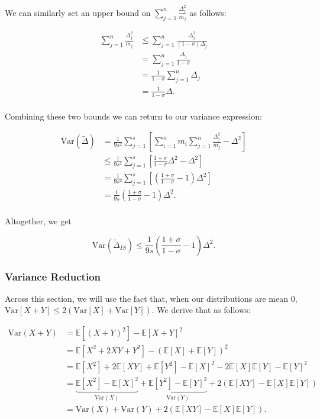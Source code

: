 \documentclass[11pt, margin=1in]{article}
\begin{document}
We can similarly set an upper bound on $\sum_{j = 1}^{n}\frac{\Delta_j^2}{m_j}$ as follows:

\[
\begin{aligned}
\sum_{j = 1}^{n}\frac{\Delta_j^2}{m_j} &\leq \sum_{j = 1}^{n}\frac{\Delta_j^2}{\left(1 - \sigma\right) \Delta_j} \\
&= \sum_{j = 1}^{n}\frac{\Delta_j}{1 - \sigma} \\
&= \frac{1}{1 - \sigma} \sum_{j = 1}^{n}\Delta_j \\
&= \frac{1}{1 - \sigma} \Delta. \\
\end{aligned}
\]

Combining these two bounds we can return to our variance expression:

\[
\begin{aligned}
\mathrm{Var}\left(\tilde{\Delta}\right) &= \frac{1}{9s^2} \sum_{j = 1}^{s} \left[\sum_{i = 1}^{n}m_i \sum_{j = 1}^{n}\frac{\Delta_j^2}{m_j} - \Delta^2\right] \\
&\leq \frac{1}{9s^2} \sum_{j = 1}^{s} \left[\frac{1 + \sigma}{1 - \sigma} \Delta^2 - \Delta^2\right] \\
&= \frac{1}{9s^2} \sum_{j = 1}^{s} \left[\left(\frac{1 + \sigma}{1 - \sigma} - 1\right) \Delta^2\right] \\
&= \frac{1}{9s} \left(\frac{1 + \sigma}{1 - \sigma} - 1\right) \Delta^2. \\
\end{aligned}
\]

Altogether, we get

\begin{equation}
    \mathrm{Var}\left(\tilde{\Delta}_{IS}\right) \leq \frac{1}{9s} \left(\frac{1 + \sigma}{1 - \sigma} - 1\right) \Delta^2.
\label{eq:Var_Delta_IS}
\end{equation}

\subsubsection{Variance Reduction}
\label{sec:variance-reduction-analysis}

Across this section, we will use the fact that, when our distributions are mean 0, $\mathrm{Var}\left[X+Y\right] \leq 2\left(\mathrm{Var}\left[X\right] + \mathrm{Var}\left[Y\right]\right)$. We derive that as follows:

\[
\begin{aligned}
\mathrm{Var}(X + Y) &= \mathbb{E}[(X + Y)^2] - \mathbb{E}[X + Y]^2 \\
&= \mathbb{E}[X^2 + 2XY + Y^2] - (\mathbb{E}[X] + \mathbb{E}[Y])^2 \\
&= \mathbb{E}[X^2] + 2\mathbb{E}[XY] + \mathbb{E}[Y^2] - \mathbb{E}[X]^2 - 2\mathbb{E}[X]\mathbb{E}[Y] - \mathbb{E}[Y]^2 \\
&= \underbrace{\mathbb{E}[X^2] - \mathbb{E}[X]^2}_{\mathrm{Var}(X)} + \underbrace{\mathbb{E}[Y^2] - \mathbb{E}[Y]^2}_{\mathrm{Var}(Y)} + 2(\mathbb{E}[XY] - \mathbb{E}[X]\mathbb{E}[Y]) \\
&= \mathrm{Var}(X) + \mathrm{Var}(Y) + 2(\mathbb{E}[XY] - \mathbb{E}[X]\mathbb{E}[Y]).
\end{aligned}
\]
    
\end{document}
